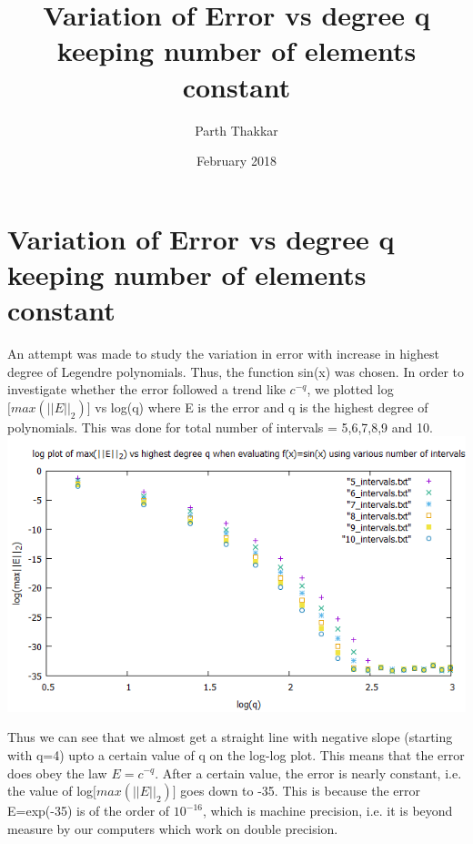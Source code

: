 \documentclass{article}
\title{Variation of Error vs degree q keeping number of elements constant}
\author{Parth Thakkar}
\date{February 2018}
\begin{document}
\section*{Variation of Error vs degree q keeping number of elements constant}
An attempt was made to study the variation in error with increase in highest degree of Legendre polynomials. Thus, the function sin(x) was chosen. In order to investigate whether the error followed a trend like $c^{-q}$, we plotted log$\big[max(||E||_{2})\big]$ vs log(q) where E is the error and q is the highest degree of polynomials. This was done for total number of intervals = 5,6,7,8,9 and 10.
\includegraphics[scale=0.5]{hw3.png}

Thus we can see that we almost get a straight line with negative slope (starting with q=4) upto a certain value of q on the log-log plot. This means that the error does obey the law $E=c^{-q}$. After a certain value, the error is nearly constant, i.e. the value of log$\big[max(||E||_{2})\big]$ goes down to -35. This is because the error E=exp(-35) is of the order of $10^{-16}$, which is machine precision, i.e. it is beyond measure by our computers which work on double precision.
\end{document}
